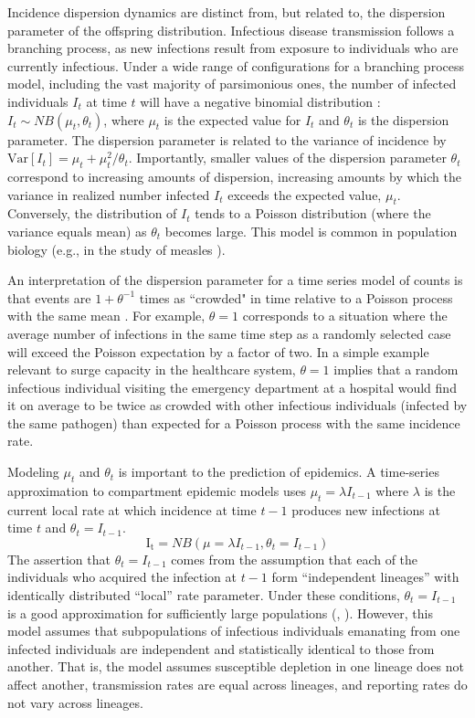 \documentclass[10pt,letterpaper]{article}
\begin{document}
Incidence dispersion dynamics are distinct from, but related to, the dispersion parameter of the offspring distribution. 
Infectious disease transmission follows a branching process, as new infections result from exposure to individuals who are currently infectious. 
Under a wide range of configurations for a branching process model, including the vast majority of parsimonious ones, the number of infected individuals $I_t$ at time $t$ will have a negative binomial distribution \cite{kendall_stochastic_1949}: $I_t \sim NB \left( \mu_t, \theta_t \right)$, where $\mu_t$ is the expected value for $I_t$ and $\theta_t$ is the dispersion parameter. 
The dispersion parameter is related to the variance of incidence by $\mathrm{Var}[I_t] = \mu_t + \mu_t^2 / \theta_t$. 
Importantly, smaller values of the dispersion parameter $\theta_t$ correspond to increasing amounts of dispersion, increasing amounts by which the variance in realized number infected $I_t$ exceeds the expected value, $\mu_t$. 
Conversely, the distribution of $I_t$ tends to a Poisson distribution (where the variance equals mean) as $\theta_t$ becomes large. 
This model is common in population biology (e.g., in the study of measles \cite{grenfell_dynamics_2002}).

An interpretation of the dispersion parameter for a time series model of counts is that events are $1 + \theta^{-1}$ times as ``crowded" in time relative to a Poisson process with the same mean \cite{lloyd_mean_1967}. For example, $\theta = 1$ corresponds to a situation where the average number of infections in the same time step as a randomly selected case will exceed the Poisson expectation by a factor of two. In a simple example relevant to surge capacity in the healthcare system, $\theta = 1$ implies that a random infectious individual visiting the emergency department at a hospital would find it on average to be twice as crowded with other infectious individuals (infected by the same pathogen) than expected for a Poisson process with the same incidence rate.

Modeling $\mu_t$ and $\theta_t$ is important to the prediction of epidemics. A time-series approximation to compartment epidemic models uses $\mu_t = \lambda I_{t-1}$ where $\lambda$ is the current local rate at which incidence at time $t-1$ produces new infections at time $t$ and $\theta_t = I_{t-1}$. 
\begin{equation}
    \mathrm{I_t} = NB(\mu = \lambda I_{t-1}, \theta_t = I_{t-1})
\end{equation}
The assertion that $\theta_t = I_{t-1}$ comes from the assumption that each of the individuals who acquired the infection at $t-1$ form ``independent lineages'' with identically distributed ``local'' rate parameter. Under these conditions, $\theta_t = I_{t-1}$ is a good approximation for sufficiently large populations (\cite{kendall_stochastic_1949}, \cite{bjornstad_dynamics_nodate}). However, this model assumes that subpopulations of infectious individuals emanating from one infected individuals are independent and statistically identical to those from another. That is, the model assumes susceptible depletion in one lineage does not affect another, transmission rates are equal across lineages, and reporting rates do not vary across lineages. 
\end{document}
